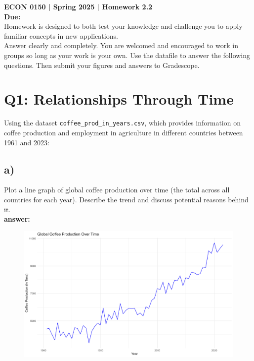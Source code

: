 \documentclass[12pt]{article}
\begin{document}
\vspace*{-1cm}
\noindent \textbf{ECON 0150 | Spring 2025 | Homework 2.2} \\
\textbf{Due: } \\

\noindent Homework is designed to both test your knowledge and challenge you to apply familiar concepts in new applications. \\
Answer clearly and completely. You are welcomed and encouraged to work in groups so long as your work is your own. Use the datafile to answer the following questions. Then submit your figures and answers to Gradescope.

\section*{Q1: Relationships Through Time}

Using the dataset \texttt{coffee\_prod\_in\_years.csv}, which provides information on coffee production and employment in agriculture in different countries between 1961 and 2023:

\subsection*{a)} Plot a line graph of global coffee production over time (the total across all countries for each year). Describe the trend and discuss potential reasons behind it.\\

\textbf{answer:}

\begin{figure}[h]
    \centering
    \includegraphics[width=1\linewidth]{Figures/HW_2.2_a.png}
\end{figure}
\end{document}
